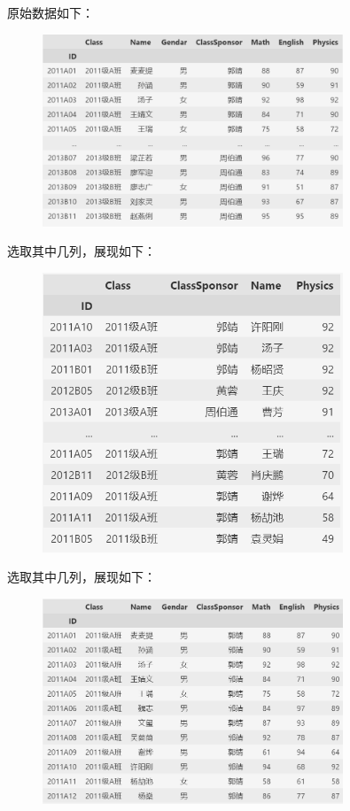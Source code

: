 \documentclass[10pt,a4paper,twoside,UTF8]{ctexart}
\begin{document}
原始数据如下：
\begin{figure}[H]
	\centering
	\includegraphics[width=0.8\textwidth]{img//table0.png}
	\label{fig:table0}
\end{figure}
选取其中几列，展现如下：
\begin{figure}[H]
	\centering
	\includegraphics[width=0.8\textwidth]{img//table1.png}
	\label{fig:table1}
\end{figure}
选取其中几列，展现如下：
\begin{figure}[H]
	\centering
	\includegraphics[width=0.8\textwidth]{img//table2.png}
	\label{fig:table2}
\end{figure}
\end{document}
